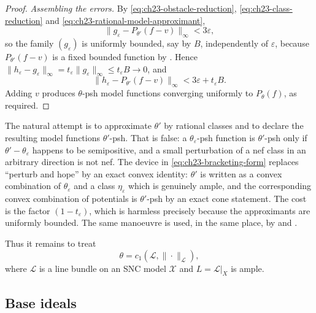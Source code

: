 \begin{proof}
\emph{Assembling the errors.}
By \eqref{eq:ch23-obstacle-reduction},
\eqref{eq:ch23-class-reduction} and
\eqref{eq:ch23-rational-model-approximant},
\[
 \|g_\varepsilon-P_{\theta'}(f-v)\|_\infty<3\varepsilon,
\]
so the family \((g_\varepsilon)\) is uniformly bounded, say by \(B\),
independently of \(\varepsilon\), because \(P_{\theta'}(f-v)\) is a fixed
bounded function by .  Hence
\(\|h_\varepsilon-g_\varepsilon\|_\infty
=t_\varepsilon\|g_\varepsilon\|_\infty\leq t_\varepsilon B\to0\), and
\[
 \|h_\varepsilon-P_{\theta'}(f-v)\|_\infty
 <3\varepsilon+t_\varepsilon B .
\]
Adding \(v\) produces \(\theta\)-psh model functions converging uniformly to
\(P_\theta(f)\), as required.
\end{proof}

\begin{remark}
\label{rem:ch23-curvature-correction}
The natural attempt is to approximate \(\theta'\) by rational classes and to
declare the resulting model functions \(\theta'\)-psh.  That is false: a
\(\theta_\varepsilon\)-psh function is \(\theta'\)-psh only if
\(\theta'-\theta_\varepsilon\) happens to be semipositive, and a small
perturbation of a nef class in an arbitrary direction is not nef.  The
device in \eqref{eq:ch23-bracketing-form} replaces ``perturb and hope'' by an
exact convex identity: \(\theta'\) is written as a convex combination of
\(\theta_\varepsilon\) and a class \(\eta_\varepsilon\) which is genuinely
ample, and the corresponding convex combination of potentials is
\(\theta'\)-psh by an exact cone statement.  The cost is the factor
\((1-t_\varepsilon)\), which is harmless precisely because the approximants
are uniformly bounded.  The same manoeuvre is used, in the same place, by
\cite[proof of Theorem~8.3]{BFJ16} and \cite[Lemma~8.4]{GJKM19}.
\end{remark}

Thus it remains to treat
\begin{equation}\label{eq:ch23-integral-reference}
             \theta=c_1(\mathcal L,\|\cdot\|_{\mathcal L}),
\end{equation}
where \(\mathcal L\) is a line bundle on an SNC model \(\mathcal X\) and
\(L=\mathcal L|_X\) is ample.

\subsection{Base ideals}
\label{sec:ch23-base-ideals}

